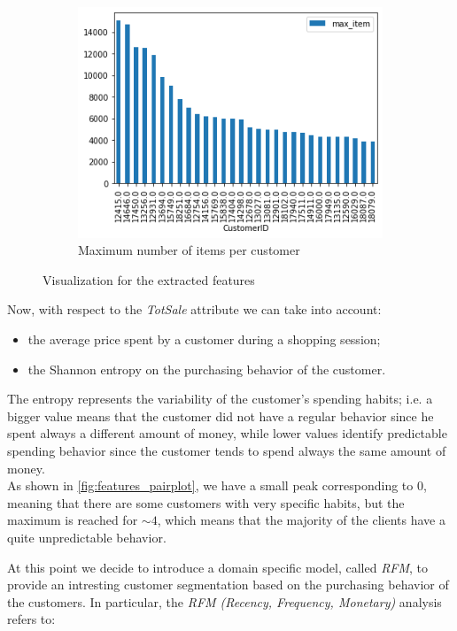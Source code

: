 \begin{figure}[h!]
\begin{subfigure}{.3\textwidth}
\centering
\includegraphics[width=\textwidth]{img/preparation/max_item.png}
\caption{Maximum number of items per customer}
\label{fig:max_item}
\end{subfigure}
\caption{Visualization for the extracted features}
\label{fig:qta_features}
\end{figure}

Now, with respect to the \emph{TotSale} attribute we can take into account:
\begin{itemize}
\item the average price spent by a customer during a shopping session;
\item the Shannon entropy on the purchasing behavior of the customer.
\end{itemize}

The entropy represents the variability of the customer's spending habits; i.e. a bigger value means that the customer did not have a regular behavior since he spent always a different amount of money, while lower values identify predictable spending behavior since the customer tends to spend always the same amount of money.\\
As shown in \ref{fig:features_pairplot}, we have a small peak corresponding to 0, meaning that there are some customers with very specific habits, but the maximum is reached for $\sim 4$, which means that the majority of the clients have a quite unpredictable behavior.

At this point we decide to introduce a domain specific model, called \emph{RFM}, to provide an intresting customer segmentation based on the purchasing behavior of the customers. In particular, the \emph{RFM (Recency, Frequency, Monetary)} analysis refers to:

